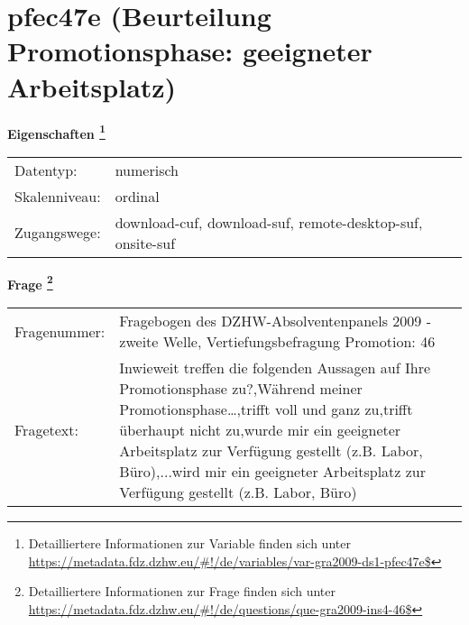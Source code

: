 
    \setcounter{footnote}{0}

    \vspace*{-1.8cm}
	\section{pfec47e (Beurteilung Promotionsphase: geeigneter Arbeitsplatz)}
	\label{section:pfec47e}



    \vspace*{0.5cm}
    \noindent\textbf{Eigenschaften
	\footnote{Detailliertere Informationen zur Variable finden sich unter
		\url{https://metadata.fdz.dzhw.eu/\#!/de/variables/var-gra2009-ds1-pfec47e$}}}\\
	\begin{tabularx}{\hsize}{@{}lX}
	Datentyp: & numerisch \\
	Skalenniveau: & ordinal \\
	Zugangswege: &
	  download-cuf, 
	  download-suf, 
	  remote-desktop-suf, 
	  onsite-suf
 \\
    \end{tabularx}



				\vspace*{0.5cm}
                \noindent\textbf{Frage
	                \footnote{Detailliertere Informationen zur Frage finden sich unter
		              \url{https://metadata.fdz.dzhw.eu/\#!/de/questions/que-gra2009-ins4-46$}}}\\
				\begin{tabularx}{\hsize}{@{}lX}
					Fragenummer: &
					  Fragebogen des DZHW-Absolventenpanels 2009 - zweite Welle, Vertiefungsbefragung Promotion:
					  46
 \\
					Fragetext: & Inwieweit treffen die folgenden Aussagen auf Ihre Promotionsphase zu?,Während meiner Promotionsphase…,trifft voll und ganz zu,trifft überhaupt nicht zu,wurde mir ein geeigneter Arbeitsplatz zur Verfügung gestellt (z.B. Labor, Büro),...wird mir ein geeigneter Arbeitsplatz zur Verfügung gestellt (z.B. Labor, Büro) \\
				\end{tabularx}





